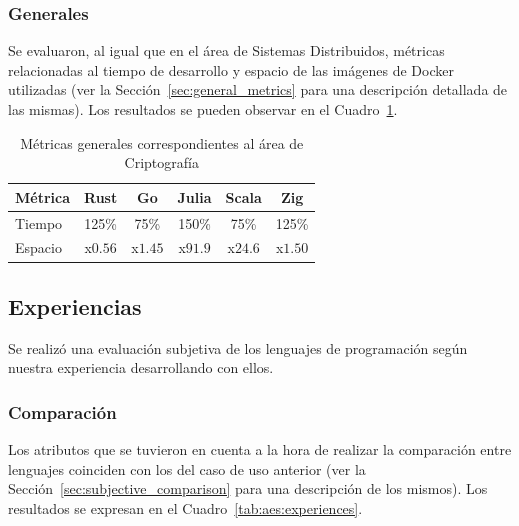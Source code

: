 \documentclass[11pt]{article}
\let\Oldsubsection\subsection
\renewcommand{\subsection}{\FloatBarrier\Oldsubsection}
\let\Oldsubsubsection\subsubsection
\renewcommand{\subsubsection}{\FloatBarrier\Oldsubsubsection}
\begin{document}

\subsubsection{Generales}

Se evaluaron, al igual que en el área de Sistemas Distribuidos, métricas relacionadas al tiempo de desarrollo y espacio de las imágenes de Docker utilizadas (ver la Sección~\ref{sec:general_metrics} para una descripción detallada de las mismas). Los resultados se pueden observar en el Cuadro~\ref{tab:aes:relative_general_metrics}.

\begin{table}[h]
\centering
\begin{tabular}{|l|c|c|c|c|c|}
\hline
\multicolumn{1}{|c|}{Métrica} & Rust & Go & Julia & Scala & Zig \\ \hline
Tiempo & 125\% & 75\% & 150\% & 75\% & 125\% \\ \hline
Espacio & x$0.56$ & x$1.45$ & x$91.9$ & x$24.6$ & x$1.50$ \\ \hline
\end{tabular}
\caption{Métricas generales correspondientes al área de Criptografía}
\label{tab:aes:relative_general_metrics}
\end{table}

\subsection{Experiencias}

Se realizó una evaluación subjetiva de los lenguajes de programación según nuestra experiencia desarrollando con ellos.

\subsubsection{Comparación}

Los atributos que se tuvieron en cuenta a la hora de realizar la comparación entre lenguajes coinciden con los del caso de uso anterior (ver la Sección~\ref{sec:subjective_comparison} para una descripción de los mismos).
Los resultados se expresan en el Cuadro~\ref{tab:aes:experiences}.
\end{document}
